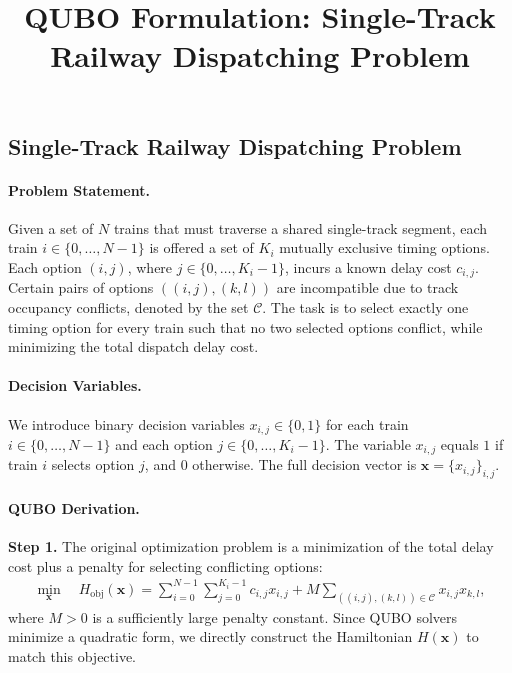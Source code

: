 \documentclass[12pt]{article}
\title{QUBO Formulation: Single-Track Railway Dispatching Problem}
\date{}
\begin{document}
\maketitle

\subsection*{Single-Track Railway Dispatching Problem}

\paragraph{Problem Statement.}
Given a set of $N$ trains that must traverse a shared single-track segment, each train $i \in \{0, \dots, N-1\}$ is offered a set of $K_i$ mutually exclusive timing options. Each option $(i,j)$, where $j \in \{0, \dots, K_i-1\}$, incurs a known delay cost $c_{i,j}$. Certain pairs of options $((i,j), (k,l))$ are incompatible due to track occupancy conflicts, denoted by the set $\mathcal{C}$. The task is to select exactly one timing option for every train such that no two selected options conflict, while minimizing the total dispatch delay cost.

\paragraph{Decision Variables.}
We introduce binary decision variables $x_{i,j} \in \{0,1\}$ for each train $i \in \{0, \dots, N-1\}$ and each option $j \in \{0, \dots, K_i-1\}$. The variable $x_{i,j}$ equals $1$ if train $i$ selects option $j$, and $0$ otherwise. The full decision vector is $\mathbf{x} = \{x_{i,j}\}_{i,j}$.

\paragraph{QUBO Derivation.}
\textbf{Step 1.} The original optimization problem is a minimization of the total delay cost plus a penalty for selecting conflicting options:
\begin{align}
\min_{\mathbf{x}} \quad H_{\text{obj}}(\mathbf{x}) = \sum_{i=0}^{N-1} \sum_{j=0}^{K_i-1} c_{i,j} x_{i,j} + M \sum_{((i,j),(k,l)) \in \mathcal{C}} x_{i,j} x_{k,l},
\end{align}
where $M > 0$ is a sufficiently large penalty constant. Since QUBO solvers minimize a quadratic form, we directly construct the Hamiltonian $H(\mathbf{x})$ to match this objective.
\end{document}
